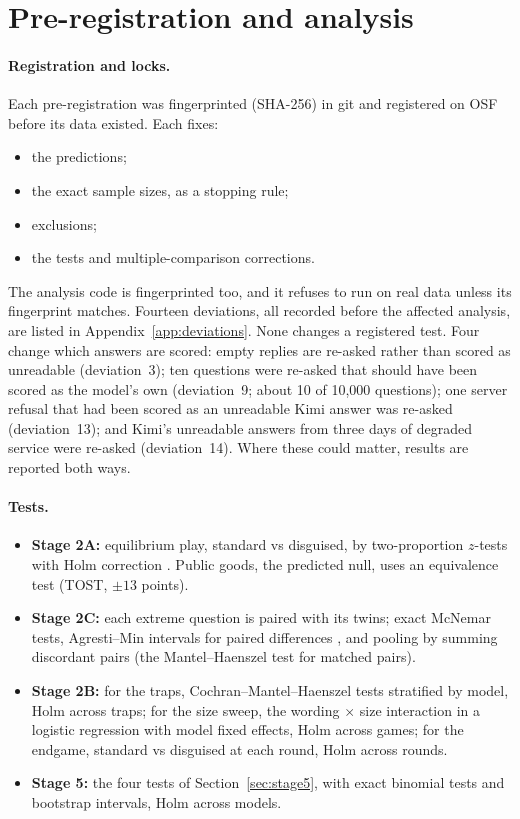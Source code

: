 \documentclass[11pt]{article}
\theoremstyle{definition}
\theoremstyle{remark}
\begin{document}
\section{Pre-registration and analysis}\label{sec:analysis}

\paragraph{Registration and locks.} Each pre-registration was fingerprinted (SHA-256) in git and
registered on OSF before its data existed. Each fixes:
\begin{itemize}
\item the predictions;
\item the exact sample sizes, as a stopping rule;
\item exclusions;
\item the tests and multiple-comparison corrections.
\end{itemize}
The analysis code is fingerprinted too, and it refuses to run on real data unless its
fingerprint matches. Fourteen deviations, all recorded before the affected analysis, are listed in
Appendix~\ref{app:deviations}. None changes a registered test. Four change which answers are
scored: empty replies are re-asked rather than scored as unreadable (deviation~3); ten questions
were re-asked that should have been scored as the model's own (deviation~9; about 10 of 10{,}000
questions); one server refusal that had been scored as an unreadable Kimi answer was re-asked
(deviation~13); and Kimi's unreadable answers from three days of degraded service were re-asked
(deviation~14). Where these could matter, results are reported both ways.

\paragraph{Tests.}
\begin{itemize}
\item \textbf{Stage 2A:} equilibrium play, standard vs disguised, by two-proportion $z$-tests with
  Holm correction \citep{holm1979}. Public goods, the predicted null, uses an equivalence test
  (TOST, $\pm13$ points).
\item \textbf{Stage 2C:} each extreme question is paired with its twins; exact McNemar tests,
  Agresti--Min intervals for paired differences \citep{agresti2005matched}, and pooling by
  summing discordant pairs (the Mantel--Haenszel test for matched pairs).
\item \textbf{Stage 2B:} for the traps, Cochran--Mantel--Haenszel tests stratified by model,
  Holm across traps; for the size sweep, the wording $\times$ size interaction in a logistic
  regression with model fixed effects, Holm across games; for the endgame, standard vs disguised
  at each round, Holm across rounds.
\item \textbf{Stage 5:} the four tests of Section~\ref{sec:stage5}, with exact binomial tests and
  bootstrap intervals, Holm across models.
\end{itemize}
\end{document}
